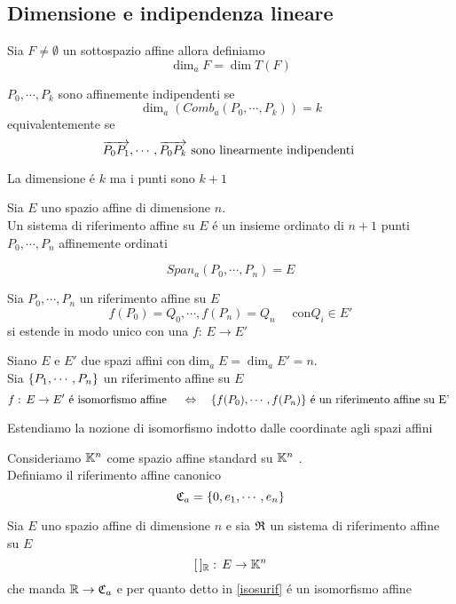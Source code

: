 \subsection{Dimensione e indipendenza lineare}
\begin{defn}\bianco
Sia $F \neq\emptyset$ un sottospazio affine allora definiamo 
$$ \dim_a F = \dim T(F)$$
\end{defn}
\spazio
\begin{defn}\bianco
$P_0, \cdots , P_k$ sono affinemente indipendenti se 
$$ \dim_a \left( Comb_a (P_0, \cdots , P_k ) \right) =k $$
equivalentemente se 
$$ \overrightarrow{ P_0 P_1 }, \cdots , \overrightarrow{P_0 P_k }  \text{  sono linearmente indipendenti }$$
\begin{oss}La dimensione \'e $k$ ma i punti sono $k+1$
\end{oss}
\end{defn}
\spazio
\begin{defn}\bianco
Sia $E$ uno spazio affine di dimensione $n$.\\
Un sistema di riferimento affine su $E$ \'e un insieme ordinato di $n+1$ punti $P_0, \cdots , P_n$ affinemente ordinati
\begin{oss}
$$Span_a(P_0, \cdots , P_n)=E$$
\end{oss}
\end{defn}
\spazio
\begin{prop}Sia $P_0, \cdots , P_n$ un riferimento affine su $E$ 
$$ f(P_0)=Q_0 , \cdots , f(P_n)=Q_n \quad \text{ con} Q_i \in E'$$
si estende in modo unico con una $f:\, E\to E'$
\end{prop}
\begin{cor}\label{isosurif}Siano $E$ e $E'$ due spazi affini con$\dim_a E = \dim_a E' = n$.\\
Sia $\{ P_1, \cdots , P_n \}$ un riferimento affine su $E$
$$ f:\, E \to E' \text{ \'e isomorfismo affine } \quad \Leftrightarrow \quad \{ f(P_0) , \cdots , f(P_n) \} \text{ \'e un riferimento affine su E' }$$
\end{cor}
\spazio
Estendiamo la nozione di isomorfismo indotto dalle coordinate agli spazi affini
\begin{defn}\bianco
Consideriamo $\mathbb{K}^n $ come spazio affine standard su $\mathbb{K}^n$ .\\
Definiamo il riferimento affine canonico 
$$ \mathfrak{C}_a =\{ 0, e_1, \cdots , e_n \} $$
\end{defn}
\spazio
\begin{defn}\bianco
Sia $E$ uno spazio affine di dimensione $n$ e sia $\mathfrak{R}$ un sistema di riferimento affine su $E$
$$ [\, ]_{\mathbb{R}} :\, E \to \mathbb{K}^n$$
che manda $\mathbb{R} \to \mathfrak{C}_a$ e per quanto detto in \ref{isosurif} \'e un isomorfismo affine
\end{defn}
\spazio
